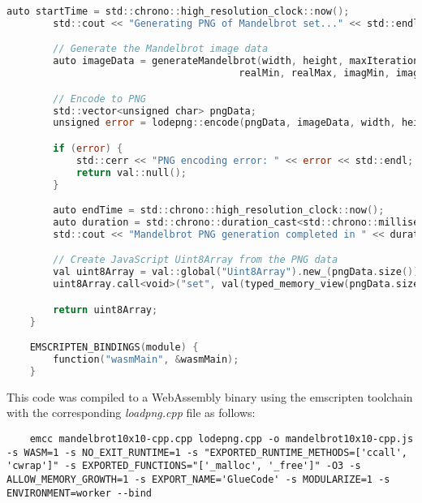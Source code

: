 \begin{lstlisting}[language=go, frame=tb, caption={Mandelbrot Set Calculation (WASM build)}]
        auto startTime = std::chrono::high_resolution_clock::now();
        std::cout << "Generating PNG of Mandelbrot set..." << std::endl;

        // Generate the Mandelbrot image data
        auto imageData = generateMandelbrot(width, height, maxIterations,
                                        realMin, realMax, imagMin, imagMax);

        // Encode to PNG
        std::vector<unsigned char> pngData;
        unsigned error = lodepng::encode(pngData, imageData, width, height);

        if (error) {
            std::cerr << "PNG encoding error: " << error << std::endl;
            return val::null();
        }

        auto endTime = std::chrono::high_resolution_clock::now();
        auto duration = std::chrono::duration_cast<std::chrono::milliseconds>(endTime - startTime);
        std::cout << "Mandelbrot PNG generation completed in " << duration.count() << "ms" << std::endl;

        // Create JavaScript Uint8Array from the PNG data
        val uint8Array = val::global("Uint8Array").new_(pngData.size());
        uint8Array.call<void>("set", val(typed_memory_view(pngData.size(), pngData.data())));

        return uint8Array;
    }

    EMSCRIPTEN_BINDINGS(module) {
        function("wasmMain", &wasmMain);
    }
\end{lstlisting}

This code was compiled to a WebAssembly binary using the emscripten \cite{methodology:emcc} toolchain with the corresponding \emph{loadpng.cpp} file as follows:
\begin{lstlisting}
    emcc mandelbrot10x10-cpp.cpp lodepng.cpp -o mandelbrot10x10-cpp.js -s WASM=1 -s NO_EXIT_RUNTIME=1 -s "EXPORTED_RUNTIME_METHODS=['ccall', 'cwrap']" -s EXPORTED_FUNCTIONS="['_malloc', '_free']" -O3 -s ALLOW_MEMORY_GROWTH=1 -s EXPORT_NAME='GlueCode' -s MODULARIZE=1 -s ENVIRONMENT=worker --bind
\end{lstlisting}